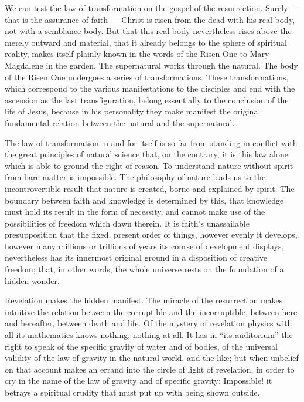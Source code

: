\documentclass[12pt,a4paper,openany]{book}
\newcommand{\opage}[1]{\marginnote{\footnotesize\textit{[#1]}}}
\begin{document}
We can test the law of transformation on the gospel of the resurrection.
Surely --- that is the assurance of faith
--- Christ is risen from the dead with his
real body, not with a semblance-body. But that this
real body nevertheless rises above the merely
outward and material, that it already belongs to the sphere
of spiritual reality, makes itself plainly known
in the words of the Risen One to Mary Magdalene in the garden.
The supernatural works through the natural.
\setcounter{footnote}{0}%
\opage{73}The body of the Risen One undergoes a series of transformations.
These transformations, which correspond to the various
manifestations to the disciples and end with
the ascension as the last transfiguration, belong essentially
to the conclusion of the life of Jesus, because in his
personality they make manifest the original fundamental relation between
the natural and the supernatural.

The law of transformation in and for itself is so far from
standing in conflict with the great principles of natural science that,
on the contrary, it is this law alone which is able to ground
the right of reason. To understand nature without spirit
from bare matter is impossible. The philosophy of nature
leads us to the incontrovertible result that nature
is created, borne and explained by spirit. The boundary between
faith and knowledge is determined by this, that knowledge must hold
its result in the form of necessity, and cannot make
use of the possibilities of freedom which dawn therein. It
is faith's unassailable presupposition that the fixed,
present order of things, however evenly it develops,
however many millions or trillions of years its
course of development displays, nevertheless has its innermost
original ground in a disposition of creative freedom; that,
in other words, the whole universe rests on the foundation
of a hidden wonder.

Revelation makes the hidden manifest. The miracle of the resurrection
makes intuitive the relation between the
corruptible and the incorruptible, between here and
hereafter, between death and life. Of the mystery of revelation
physics with all its mathematics knows nothing,
nothing at all. It has in ``its auditorium'' the right to speak
of the specific gravity of water and of bodies, of the universal validity
of the law of gravity in the natural world, and the like; but
\setcounter{footnote}{0}%
\opage{74}when unbelief on that account makes an errand into
the circle of light of revelation, in order to cry in the name of the law of gravity
and of specific gravity: Impossible! it betrays a spiritual crudity
that must put up with being shown outside.
\end{document}
